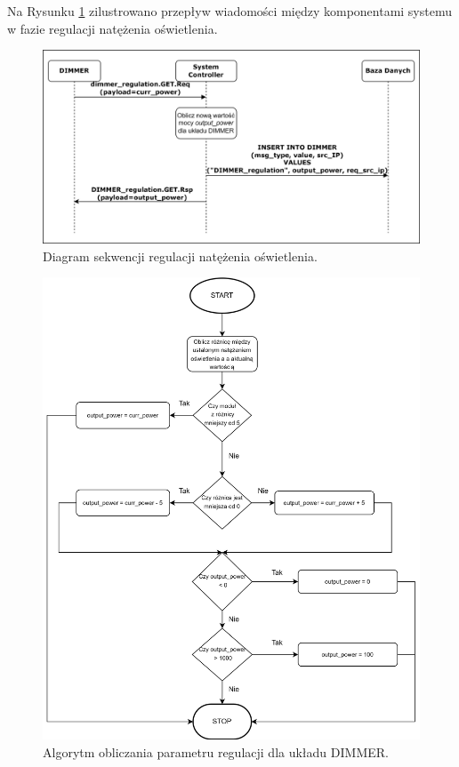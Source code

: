             Na Rysunku \ref{fig:seq-dimmer-regulate} zilustrowano przepływ wiadomości między komponentami systemu w fazie regulacji natężenia oświetlenia.

            \begin{figure}[H]
                \centering
                \includegraphics[width=0.8\linewidth]{graphics/sequence-diagrams/dimmer-regulate-seq.png}
                \caption{Diagram sekwencji regulacji natężenia oświetlenia.}
                \label{fig:seq-dimmer-regulate}
            \end{figure}

            \begin{figure}[H]
                \centering
                \includegraphics[width=0.8\linewidth]{graphics/dimmer-block-diagram.png}
                \caption{Algorytm obliczania parametru regulacji dla układu DIMMER.}
                \label{fig:seq-dimmer-algo}
            \end{figure}

